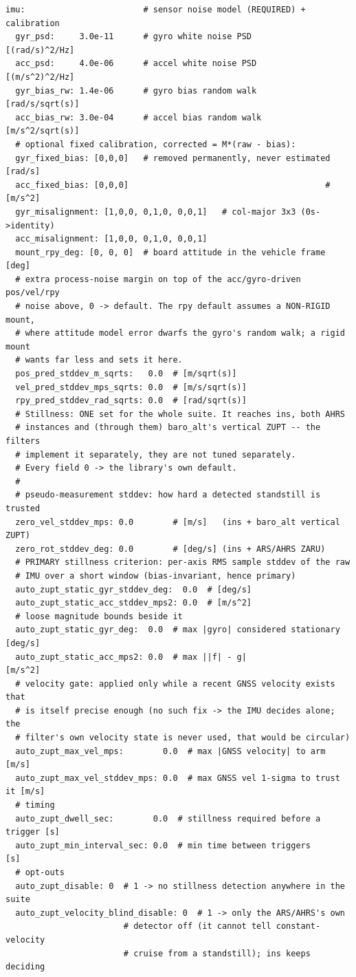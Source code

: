 \documentclass[11pt,a4paper]{article}
\begin{document}
\begin{lstlisting}[style=cfg]
imu:                        # sensor noise model (REQUIRED) + calibration
  gyr_psd:     3.0e-11      # gyro white noise PSD        [(rad/s)^2/Hz]
  acc_psd:     4.0e-06      # accel white noise PSD       [(m/s^2)^2/Hz]
  gyr_bias_rw: 1.4e-06      # gyro bias random walk       [rad/s/sqrt(s)]
  acc_bias_rw: 3.0e-04      # accel bias random walk      [m/s^2/sqrt(s)]
  # optional fixed calibration, corrected = M*(raw - bias):
  gyr_fixed_bias: [0,0,0]   # removed permanently, never estimated [rad/s]
  acc_fixed_bias: [0,0,0]                                        # [m/s^2]
  gyr_misalignment: [1,0,0, 0,1,0, 0,0,1]   # col-major 3x3 (0s->identity)
  acc_misalignment: [1,0,0, 0,1,0, 0,0,1]
  mount_rpy_deg: [0, 0, 0]  # board attitude in the vehicle frame [deg]
  # extra process-noise margin on top of the acc/gyro-driven pos/vel/rpy
  # noise above, 0 -> default. The rpy default assumes a NON-RIGID mount,
  # where attitude model error dwarfs the gyro's random walk; a rigid mount
  # wants far less and sets it here.
  pos_pred_stddev_m_sqrts:   0.0  # [m/sqrt(s)]
  vel_pred_stddev_mps_sqrts: 0.0  # [m/s/sqrt(s)]
  rpy_pred_stddev_rad_sqrts: 0.0  # [rad/sqrt(s)]
  # Stillness: ONE set for the whole suite. It reaches ins, both AHRS
  # instances and (through them) baro_alt's vertical ZUPT -- the filters
  # implement it separately, they are not tuned separately.
  # Every field 0 -> the library's own default.
  #
  # pseudo-measurement stddev: how hard a detected standstill is trusted
  zero_vel_stddev_mps: 0.0        # [m/s]   (ins + baro_alt vertical ZUPT)
  zero_rot_stddev_deg: 0.0        # [deg/s] (ins + ARS/AHRS ZARU)
  # PRIMARY stillness criterion: per-axis RMS sample stddev of the raw
  # IMU over a short window (bias-invariant, hence primary)
  auto_zupt_static_gyr_stddev_deg:  0.0  # [deg/s]
  auto_zupt_static_acc_stddev_mps2: 0.0  # [m/s^2]
  # loose magnitude bounds beside it
  auto_zupt_static_gyr_deg:  0.0  # max |gyro| considered stationary [deg/s]
  auto_zupt_static_acc_mps2: 0.0  # max ||f| - g|                  [m/s^2]
  # velocity gate: applied only while a recent GNSS velocity exists that
  # is itself precise enough (no such fix -> the IMU decides alone; the
  # filter's own velocity state is never used, that would be circular)
  auto_zupt_max_vel_mps:        0.0  # max |GNSS velocity| to arm  [m/s]
  auto_zupt_max_vel_stddev_mps: 0.0  # max GNSS vel 1-sigma to trust it [m/s]
  # timing
  auto_zupt_dwell_sec:        0.0  # stillness required before a trigger [s]
  auto_zupt_min_interval_sec: 0.0  # min time between triggers          [s]
  # opt-outs
  auto_zupt_disable: 0  # 1 -> no stillness detection anywhere in the suite
  auto_zupt_velocity_blind_disable: 0  # 1 -> only the ARS/AHRS's own
                        # detector off (it cannot tell constant-velocity
                        # cruise from a standstill); ins keeps deciding


\end{lstlisting}
\end{document}
